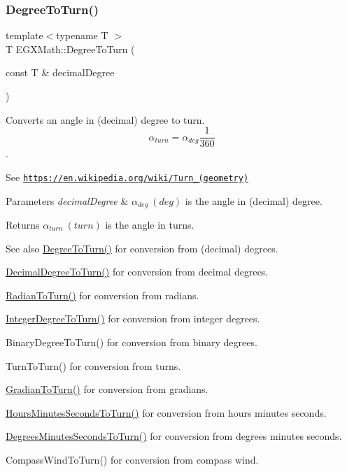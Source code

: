 \subsubsection{\texorpdfstring{Degree\+To\+Turn()}{DegreeToTurn()}}
{\footnotesize\ttfamily template$<$typename T $>$ \\
T E\+G\+X\+Math\+::\+Degree\+To\+Turn (\begin{DoxyParamCaption}\item[{const T \&}]{decimal\+Degree }\end{DoxyParamCaption})}



Converts an angle in (decimal) degree to turn. \[\alpha_{turn}=\alpha_{deg}\frac{1}{360}\]. 

See \href{https://en.wikipedia.org/wiki/Turn_(geometry)}{\tt https\+://en.\+wikipedia.\+org/wiki/\+Turn\+\_\+(geometry)} 
\begin{DoxyParams}{Parameters}
{\em decimal\+Degree} & $\alpha_{deg}\ (deg)$ is the angle in (decimal) degree. \\
\hline
\end{DoxyParams}
\begin{DoxyReturn}{Returns}
$\alpha_{turn}\ (turn)$ is the angle in turns. 
\end{DoxyReturn}
\begin{DoxySeeAlso}{See also}
\mbox{\hyperlink{group___e_g_x_math-_conversions-_angle_conversions-_degree_gafb4ce930493a7d6202ede3ee1630ef5d}{Degree\+To\+Turn()}} for conversion from (decimal) degrees. 

\mbox{\hyperlink{group___e_g_x_math-_conversions-_angle_conversions-_decimal_degree_ga396a13c10acdef5026c12f3217b142c1}{Decimal\+Degree\+To\+Turn()}} for conversion from decimal degrees. 

\mbox{\hyperlink{group___e_g_x_math-_conversions-_angle_conversions-_radian_ga8492d6d2f6467c619b65e5fb75a9ae04}{Radian\+To\+Turn()}} for conversion from radians. 

\mbox{\hyperlink{group___e_g_x_math-_conversions-_angle_conversions-_integer_degree_ga06ddbdada5a3978105c855d4aae735ae}{Integer\+Degree\+To\+Turn()}} for conversion from integer degrees. 

Binary\+Degree\+To\+Turn() for conversion from binary degrees. 

Turn\+To\+Turn() for conversion from turns. 

\mbox{\hyperlink{group___e_g_x_math-_conversions-_angle_conversions-_gradian_ga11b42138910d26474f47c0a2043911c9}{Gradian\+To\+Turn()}} for conversion from gradians. 

\mbox{\hyperlink{group___e_g_x_math-_conversions-_angle_conversions-_hours_minutes_seconds_ga68050282994968cd6f80a396f6a539ae}{Hours\+Minutes\+Seconds\+To\+Turn()}} for conversion from hours minutes seconds. 

\mbox{\hyperlink{group___e_g_x_math-_conversions-_angle_conversions-_degrees_minutes_seconds_ga1e6b1b889f6914942b12623934341fc6}{Degrees\+Minutes\+Seconds\+To\+Turn()}} for conversion from degrees minutes seconds. 

Compass\+Wind\+To\+Turn() for conversion from compass wind. 
\end{DoxySeeAlso}

